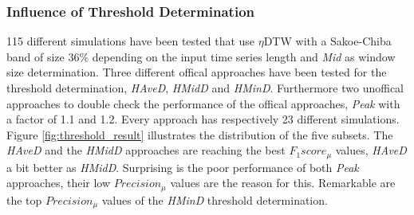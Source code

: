 \subsubsection{Influence of Threshold Determination} \label{influence_of_threshold_determination}
115 different simulations have been tested that use $\eta$DTW with a Sakoe-Chiba band of size 36\% depending on the
input time series length and \textit{Mid} as window size determination. Three different offical approaches have been
tested for the threshold determination, \textit{HAveD}, \textit{HMidD} and \textit{HMinD}. Furthermore two unoffical
approaches to double check the performance of the offical approaches, \textit{Peak} with a factor of 1.1 and 1.2. Every
approach has respectively 23 different simulations. Figure \ref{fig:threshold_result} illustrates the distribution of
the five subsets. The \textit{HAveD} and the \textit{HMidD} approaches are reaching the best $F_{1}score_{\mu}$ values,
\textit{HAveD} a bit better as \textit{HMidD}. Surprising is the poor performance of both \textit{Peak} approaches,
their low $Precision_{\mu}$ values are the reason for this. Remarkable are the top $Precision_{\mu}$ values of the
\textit{HMinD} threshold determination.

